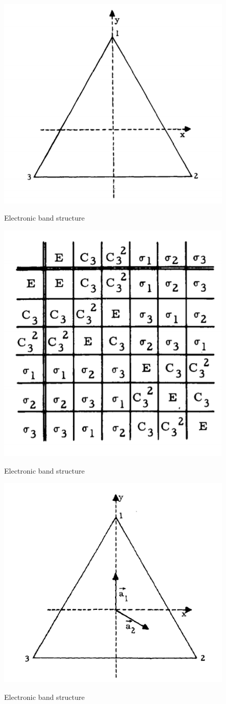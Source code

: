 \documentclass[11pt,edeposit,draftthesis]{uiucthesis2020}
\begin{document}
\begin{mainmatter}
\begin{figure}
\centering\includegraphics[width=0.5\columnwidth]{figures/ch3/C3v.png} \\
\caption{\label{fig:C3v}
Electronic band structure
}
\end{figure}

\begin{figure}
\centering\includegraphics[width=0.5\columnwidth]{figures/ch3/group_multiplication_table_C3v.png} \\
\caption{\label{fig:gmt_C3v}
Electronic band structure
}
\end{figure}

\begin{figure}
\centering\includegraphics[width=0.5\columnwidth]{figures/ch3/C3v_a1_a2.png} \\
\caption{\label{fig:C3v_a1_a2}
Electronic band structure
}
\end{figure}


\end{mainmatter}
\end{document}
